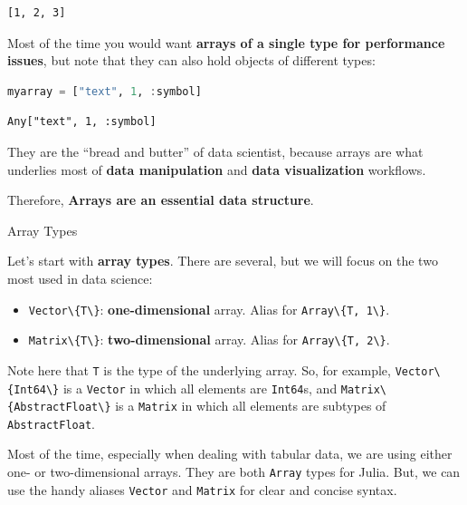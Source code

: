 \documentclass[
  notoc %
]{tufte-book}
\makeatletter
\providecommand{\tightlist}{%
  \setlength{\itemsep}{0pt}\setlength{\parskip}{0pt}
}
\newcommand{\passthrough}[1]{#1}
\renewcommand\subsubsection{%
\@startsection{subsubsection}{3}{\z@ }{-3.25ex\@plus -1ex \@minus -.2ex}{1.5ex \@plus .2ex}{\normalfont \normalsize \bfseries }
}
\makeatother
\begin{document}
\begin{lstlisting}[language=Output]
[1, 2, 3]
\end{lstlisting}

Most of the time you would want \textbf{arrays of a single type for
performance issues}, but note that they can also hold objects of
different types:

\begin{lstlisting}[language=Julia]
myarray = ["text", 1, :symbol]
\end{lstlisting}

\begin{lstlisting}[language=Output]
Any["text", 1, :symbol]
\end{lstlisting}

They are the ``bread and butter'' of data scientist, because arrays are
what underlies most of \textbf{data manipulation} and \textbf{data
visualization} workflows.

Therefore, \textbf{Arrays are an essential data structure}.

\hypertarget{sec:array_types}{%
\subsubsection{Array Types}\label{sec:array_types}}

Let's start with \textbf{array types}. There are several, but we will
focus on the two most used in data science:

\begin{itemize}
\tightlist
\item
  \passthrough{\lstinline!Vector\{T\}!}: \textbf{one-dimensional} array.
  Alias for \passthrough{\lstinline!Array\{T, 1\}!}.
\item
  \passthrough{\lstinline!Matrix\{T\}!}: \textbf{two-dimensional} array.
  Alias for \passthrough{\lstinline!Array\{T, 2\}!}.
\end{itemize}

Note here that \passthrough{\lstinline!T!} is the type of the underlying
array. So, for example, \passthrough{\lstinline!Vector\{Int64\}!} is a
\passthrough{\lstinline!Vector!} in which all elements are
\passthrough{\lstinline!Int64!}s, and
\passthrough{\lstinline!Matrix\{AbstractFloat\}!} is a
\passthrough{\lstinline!Matrix!} in which all elements are subtypes of
\passthrough{\lstinline!AbstractFloat!}.

Most of the time, especially when dealing with tabular data, we are
using either one- or two-dimensional arrays. They are both
\passthrough{\lstinline!Array!} types for Julia. But, we can use the
handy aliases \passthrough{\lstinline!Vector!} and
\passthrough{\lstinline!Matrix!} for clear and concise syntax.
\end{document}
